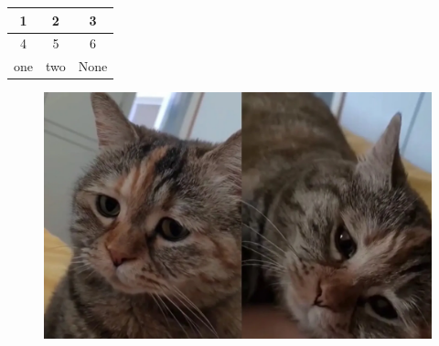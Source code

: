 \documentclass{article}
\begin{document}
\begin{table}
\begin{tabular}{|c|c|c|}
\hline
1 & 2 & 3\\\hline
4 & 5 & 6\\\hline
one & two & None\\
\hline
\end{tabular}
\end{table}


\begin{figure}
\centering
\includegraphics[width=0.25\linewidth]{../res/cat.png}
\end{figure}
\end{document}
